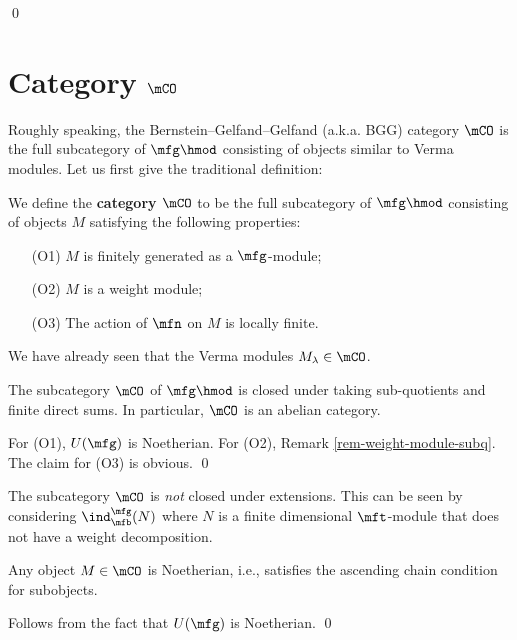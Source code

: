 \qed

\section{Category \texorpdfstring{$\mCO$}{O}}

Roughly speaking, the Bernstein--Gelfand--Gelfand (a.k.a. BGG) category $\mCO$ is the full subcategory of $\mfg\hmod$ consisting of objects similar to Verma modules. Let us first give the traditional definition:

\begin{defn}
	We define the \textbf{category $\mCO$} to be the full subcategory of $\mfg\hmod$ consisting of objects $M$ satisfying the following properties:
	\begin{itemize}
		\item[(O1)] $M$ is finitely generated as a $\mfg$-module;
		\item[(O2)] $M$ is a weight module;
		\item[(O3)] The action of $\mfn$ on $M$ is locally finite.
	\end{itemize}

\end{defn}

\begin{exam}
	We have already seen that the Verma modules $M_\lambda\in \mCO$.
\end{exam}

\begin{lem}
	The subcategory $\mCO$ of $\mfg\hmod$ is closed under taking sub-quotients and finite direct sums. In particular, $\mCO$ is an abelian category.
\end{lem}

\proof
	For (O1), $U(\mfg)$ is Noetherian. For (O2), Remark \ref{rem-weight-module-subq}. The claim for (O3) is obvious. 
\qed



\begin{warn}
	The subcategory $\mCO$ is \emph{not} closed under extensions. This can be seen by considering $\ind_\mfb^\mfg(N)$ where $N$ is a finite dimensional $\mft$-module that does not have a weight decomposition.
\end{warn}

\begin{lem}
	Any object $M\in \mCO$ is Noetherian, i.e., satisfies the ascending chain condition for subobjects.
\end{lem}

\proof
	Follows from the fact that $U(\mfg)$ is Noetherian.
\qed


